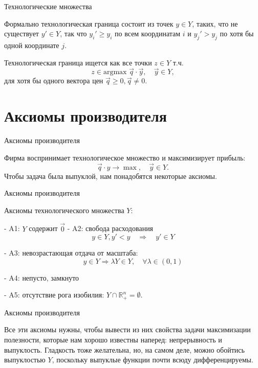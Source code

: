 \documentclass{beamer}
\begin{document}
\begin{frame}{Технологические множества}

Формально технологическая граница состоит из точек $y \in Y$, таких, что не существует $y' \in Y$, так что $y_i' \geqslant y_i$ по всем координатам $i$ и $y_j' > y_j$ по хотя бы одной координате $j$.

\begin{lemma}
Технологическая граница ищется как все точки $z \in Y$ т.ч.
$$ z \in \text{argmax } \vec q \cdot \vec y, \quad \vec y \in Y,$$
для хотя бы одного вектора цен $\vec q \geqslant 0, \vec q \neq 0$.
\end{lemma}
\end{frame}

\section{Аксиомы производителя}

\begin{frame}{Аксиомы производителя}

Фирма воспринимает технологическое множество и максимизирует прибыль:
$$ \vec q \cdot y \to \max, \quad \vec y \in Y.$$
Чтобы задача была выпуклой, нам понадобятся некоторые аксиомы.

\end{frame}

\begin{frame}{Аксиомы производителя}

\begin{definition}
Аксиомы технологического множества $Y$:

- A1: $Y$ содержит $\vec{0}$
- A2: свобода расходования
$$ y \in Y, y' < y \quad \Rightarrow \quad y' \in Y$$

- A3: невозрастающая отдача от масштаба:
$$y \in Y \Rightarrow \lambda Y \in Y, \quad \forall \lambda \in (0,1)$$

- A4: непусто, замкнуто

- A5: отсутствие рога изобилия: $Y \cap \mathbb{R}^n_{+} = \emptyset$.
\end{definition}

\end{frame}

\begin{frame}{Аксиомы производителя}

Все эти аксиомы нужны, чтобы вывести из них свойства задачи максимизации полезности, которые нам хорошо известны наперед: непрерывность и выпуклость. Гладкость тоже желательна, но, на самом деле, можно обойтись выпуклостью $Y$, поскольку выпуклые функции почти всюду дифференцируемы.

\end{frame}
\end{document}
